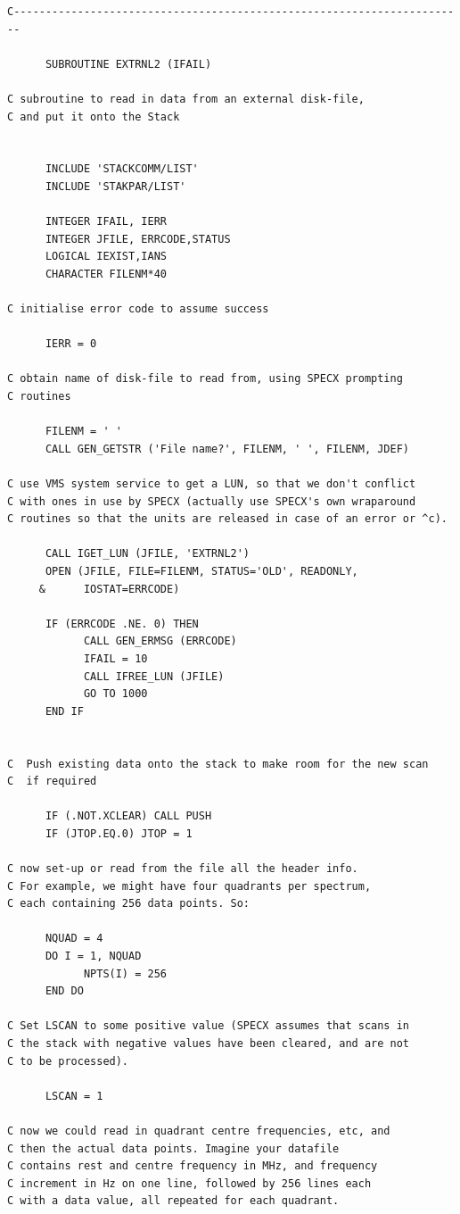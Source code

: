 \documentclass[11pt,twoside]{report}
\begin{document}
\begin{verbatim}
C-----------------------------------------------------------------------

      SUBROUTINE EXTRNL2 (IFAIL)

C subroutine to read in data from an external disk-file,
C and put it onto the Stack


      INCLUDE 'STACKCOMM/LIST'           
      INCLUDE 'STAKPAR/LIST'             

      INTEGER IFAIL, IERR                
      INTEGER JFILE, ERRCODE,STATUS
      LOGICAL IEXIST,IANS
      CHARACTER FILENM*40
                                                                  
C initialise error code to assume success

      IERR = 0

C obtain name of disk-file to read from, using SPECX prompting
C routines

      FILENM = ' '
      CALL GEN_GETSTR ('File name?', FILENM, ' ', FILENM, JDEF)

C use VMS system service to get a LUN, so that we don't conflict
C with ones in use by SPECX (actually use SPECX's own wraparound
C routines so that the units are released in case of an error or ^c).

      CALL IGET_LUN (JFILE, 'EXTRNL2')
      OPEN (JFILE, FILE=FILENM, STATUS='OLD', READONLY,
     &      IOSTAT=ERRCODE)

      IF (ERRCODE .NE. 0) THEN
            CALL GEN_ERMSG (ERRCODE)
            IFAIL = 10
            CALL IFREE_LUN (JFILE)
            GO TO 1000
      END IF


C  Push existing data onto the stack to make room for the new scan
C  if required

      IF (.NOT.XCLEAR) CALL PUSH  
      IF (JTOP.EQ.0) JTOP = 1

C now set-up or read from the file all the header info. 
C For example, we might have four quadrants per spectrum,
C each containing 256 data points. So:

      NQUAD = 4
      DO I = 1, NQUAD
            NPTS(I) = 256
      END DO

C Set LSCAN to some positive value (SPECX assumes that scans in
C the stack with negative values have been cleared, and are not
C to be processed).

      LSCAN = 1

C now we could read in quadrant centre frequencies, etc, and
C then the actual data points. Imagine your datafile
C contains rest and centre frequency in MHz, and frequency
C increment in Hz on one line, followed by 256 lines each
C with a data value, all repeated for each quadrant.


\end{verbatim}
\end{document}
